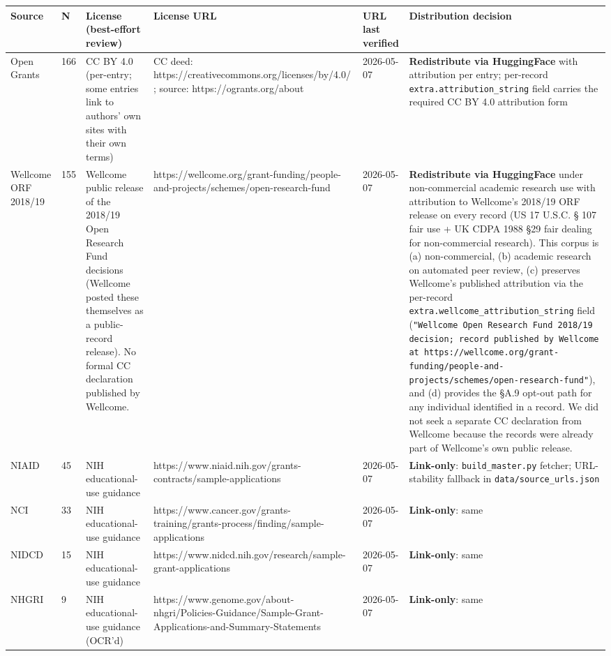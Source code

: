 \documentclass[11pt]{article}
\begin{document}
\begin{table}[H]
\centering
\small
\begin{tabular}{llllll}
\toprule
Source & N & License (best-effort review) & License URL & URL last verified & Distribution decision \\
\midrule
Open Grants & 166 & CC BY 4.0 (per-entry; some entries link to authors' own sites with their own terms) & CC deed: https://creativecommons.org/licenses/by/4.0/ ; source: https://ogrants.org/about & 2026-05-07 & \textbf{Redistribute via HuggingFace} with attribution per entry; per-record \texttt{extra.attribution\_string} field carries the required CC BY 4.0 attribution form \\
Wellcome ORF 2018/19 & 155 & Wellcome public release of the 2018/19 Open Research Fund decisions (Wellcome posted these themselves as a public-record release). No formal CC declaration published by Wellcome. & https://wellcome.org/grant-funding/people-and-projects/schemes/open-research-fund & 2026-05-07 & \textbf{Redistribute via HuggingFace} under non-commercial academic research use with attribution to Wellcome's 2018/19 ORF release on every record (US 17 U.S.C. § 107 fair use + UK CDPA 1988 §29 fair dealing for non-commercial research). This corpus is (a) non-commercial, (b) academic research on automated peer review, (c) preserves Wellcome's published attribution via the per-record \texttt{extra.wellcome\_attribution\_string} field (\texttt{"Wellcome Open Research Fund 2018/19 decision; record published by Wellcome at https://wellcome.org/grant-funding/people-and-projects/schemes/open-research-fund"}), and (d) provides the §A.9 opt-out path for any individual identified in a record. We did not seek a separate CC declaration from Wellcome because the records were already part of Wellcome's own public release. \\
NIAID & 45 & NIH educational-use guidance & https://www.niaid.nih.gov/grants-contracts/sample-applications & 2026-05-07 & \textbf{Link-only}: \texttt{build\_master.py} fetcher; URL-stability fallback in \texttt{data/source\_urls.json} \\
NCI & 33 & NIH educational-use guidance & https://www.cancer.gov/grants-training/grants-process/finding/sample-applications & 2026-05-07 & \textbf{Link-only}: same \\
NIDCD & 15 & NIH educational-use guidance & https://www.nidcd.nih.gov/research/sample-grant-applications & 2026-05-07 & \textbf{Link-only}: same \\
NHGRI & 9 & NIH educational-use guidance (OCR'd) & https://www.genome.gov/about-nhgri/Policies-Guidance/Sample-Grant-Applications-and-Summary-Statements & 2026-05-07 & \textbf{Link-only}: same \\

\end{tabular}
\end{table}
\end{document}
